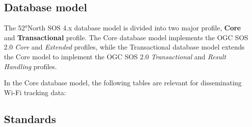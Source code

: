 \subsection{Database model}
The 52°North SOS 4.x database model is divided into two major profile,
\textbf{Core} and \textbf{Transactional} profile. The Core database model
implements the OGC SOS 2.0 \textit{Core} and \textit{Extended} profiles, while
the Transactional database model extends the Core model to implement the OGC SOS
2.0 \textit{Transactional} and \textit{Result Handling} profiles. 

In the Core database model, the following tables are relevant for disseminating
Wi-Fi tracking data:

\subsection{Standards}

